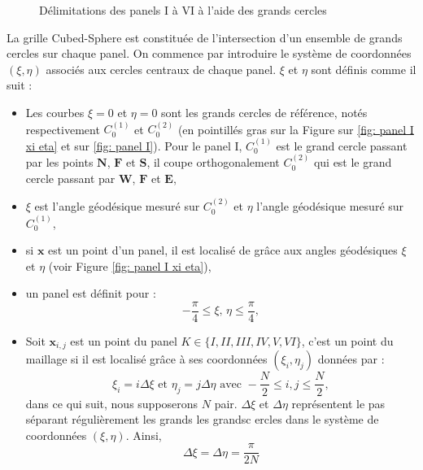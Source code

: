 \begin{figure}[htbp]
\begin{center}
\end{center}
\caption{Délimitations des panels I à VI à l'aide des grands cercles}
\label{fig: panel I to VI}
\end{figure}

La grille Cubed-Sphere est constituée de l'intersection d'un ensemble de grands cercles sur chaque panel. On commence par introduire le système de coordonnées $(\xi,\eta)$ associés aux cercles centraux de chaque panel. $\xi$ et  $\eta$ sont définis comme il suit :

\begin{itemize}
\item Les courbes $\xi = 0$ et $\eta = 0$ sont les grands cercles de référence, notés respectivement $C_0^{(1)}$ et $C_0^{(2)}$ (en pointillés gras sur la Figure sur \ref{fig: panel I xi eta} et sur \ref{fig: panel I}). Pour le panel I, $C_0^{(1)}$ est le grand cercle passant par les points $\mathbf{N}$, $\mathbf{F}$ et $\mathbf{S}$, il coupe orthogonalement $C_0^{(2)}$ qui est le grand cercle passant par $\mathbf{W}$, $\mathbf{F}$ et $\mathbf{E}$,

\item $\xi$ est l'angle géodésique mesuré sur $C_0^{(2)}$ et $\eta$ l'angle géodésique mesuré sur $C_0^{(1)}$,

\item si $\mathbf{x}$ est un point d'un panel, il est localisé de grâce aux angles géodésiques $\xi$ et $\eta$  (voir Figure \ref{fig: panel I xi eta}),

\item un panel est définit pour :
\begin{equation}
- \dfrac{\pi}{4} \leq \xi\text{, }\eta \leq \dfrac{\pi}{4},
\end{equation}

\item Soit $\mathbf{x}_{i,j}$ est un point du panel $K \in \lbrace I, II, III, IV, V, VI \rbrace$, c'est un point du maillage si il est localisé grâce à ses coordonnées $(\xi_i, \eta_j)$ données par :
\begin{equation}
\xi_i = i \Delta \xi \text{ et } \eta_j = j \Delta \eta \text{ avec } -\dfrac{N}{2} \leq i,j \leq \dfrac{N}{2},
\end{equation}
dans ce qui suit, nous supposerons $N$ pair. $\Delta \xi$ et $\Delta \eta$ représentent le pas séparant régulièrement les grands les grandsc ercles dans le système de coordonnées $(\xi, \eta)$. Ainsi, 
\begin{equation}
\Delta \xi = \Delta \eta = \dfrac{\pi}{2N}
\end{equation} 
\end{itemize}

